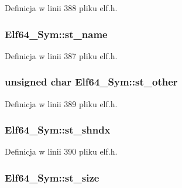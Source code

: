 Definicja w linii 388 pliku elf.\-h.

\hypertarget{struct_elf64___sym_a4069f9db0c91ecc40bc2f4ddbdf28aff}{
\subsubsection[{st\-\_\-name}]{ Elf64\-\_\-\-Sym\-::st\-\_\-name}}\label{struct_elf64___sym_a4069f9db0c91ecc40bc2f4ddbdf28aff}


Definicja w linii 387 pliku elf.\-h.

\hypertarget{struct_elf64___sym_adba66dcdbe19ab3ecc24830a58549230}{
\subsubsection[{st\-\_\-other}]{\setlength{\rightskip}{0pt plus 5cm}unsigned char Elf64\-\_\-\-Sym\-::st\-\_\-other}}\label{struct_elf64___sym_adba66dcdbe19ab3ecc24830a58549230}


Definicja w linii 389 pliku elf.\-h.

\hypertarget{struct_elf64___sym_a942ca56d5692e290b23366388fc600e6}{
\subsubsection[{st\-\_\-shndx}]{ Elf64\-\_\-\-Sym\-::st\-\_\-shndx}}\label{struct_elf64___sym_a942ca56d5692e290b23366388fc600e6}


Definicja w linii 390 pliku elf.\-h.

\hypertarget{struct_elf64___sym_af5c72e0a09802b81e8087b303ec4d29f}{
\subsubsection[{st\-\_\-size}]{ Elf64\-\_\-\-Sym\-::st\-\_\-size}}\label{struct_elf64___sym_af5c72e0a09802b81e8087b303ec4d29f}


